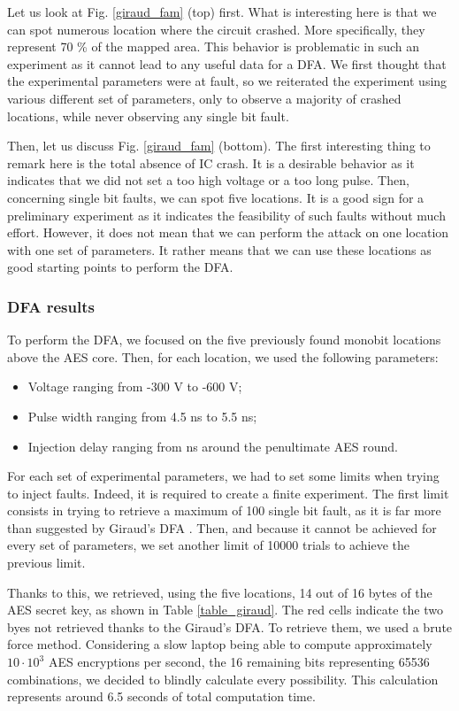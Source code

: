 			Let us look at Fig. \ref{giraud_fam} (top) first.
			What is interesting here is that we can spot numerous location where the circuit crashed.
			More specifically, they represent 70 \% of the mapped area.
			This behavior is problematic in such an experiment as it cannot lead to any useful data for a DFA.
			We first thought that the experimental parameters were at fault, so we reiterated the experiment using various different set of parameters, only to observe a majority of crashed locations, while never observing any single bit fault.

			Then, let us discuss Fig. \ref{giraud_fam} (bottom).
			The first interesting thing to remark here is the total absence of IC crash.
			It is a desirable behavior as it indicates that we did not set a too high voltage or a too long pulse.
			Then, concerning single bit faults, we can spot five locations.
			It is a good sign for a preliminary experiment as it indicates the feasibility of such faults without much effort.
			However, it does not mean that we can perform the attack on one location with one set of parameters.
			It rather means that we can use these locations as good starting points to perform the DFA.

		\subsubsection{DFA results}
			To perform the DFA, we focused on the five previously found monobit locations above the AES core.
			Then, for each location, we used the following parameters:
			\begin{itemize}
				\item Voltage ranging from -300 V to -600 V;
				\item Pulse width ranging from 4.5 ns to 5.5 ns;
				\item Injection delay ranging from  ns around the penultimate AES round.
			\end{itemize}
			For each set of experimental parameters, we had to set some limits when trying to inject faults.
			Indeed, it is required to create a finite experiment.
			The first limit consists in trying to retrieve a maximum of 100 single bit fault, as it is far more than suggested by Giraud's DFA \cite{giraudDfa}.
			Then, and because it cannot be achieved for every set of parameters, we set another limit of 10000 trials to achieve the previous limit.
			
			Thanks to this, we retrieved, using the five locations, 14 out of 16 bytes of the AES secret key, as shown in Table \ref{table_giraud}.
			The red cells indicate the two byes not retrieved thanks to the Giraud's DFA.
			To retrieve them, we used a brute force method.
			Considering a slow laptop being able to compute approximately $10 \cdot 10^3$ AES encryptions per second, the 16 remaining bits representing 65536 combinations, we decided to blindly calculate every possibility.
			This calculation represents around 6.5 seconds of total computation time.

